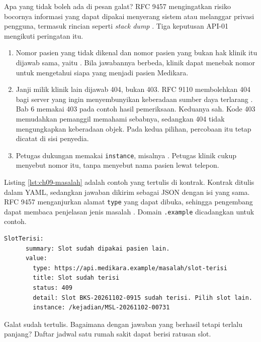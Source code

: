 Apa yang tidak boleh ada di pesan galat? RFC 9457 mengingatkan risiko bocornya informasi yang dapat dipakai menyerang sistem atau melanggar privasi
pengguna, termasuk rincian seperti \textit{stack dump} \cite{rfc9457}. Tiga keputusan API-01 mengikuti peringatan itu.
\begin{enumerate}
  \item Nomor pasien yang tidak dikenal dan nomor pasien yang bukan hak klinik itu dijawab sama, yaitu . Bila
        jawabannya berbeda, klinik dapat menebak nomor untuk mengetahui siapa yang menjadi pasien Medikara.
  \item Janji milik klinik lain dijawab 404, bukan 403. RFC 9110 membolehkan 404 bagi server yang ingin menyembunyikan keberadaan sumber daya
        terlarang \cite{rfc9110}. Bab 6 memakai 403 pada contoh hasil pemeriksaan. Keduanya sah. Kode 403 memudahkan pemanggil memahami sebabnya, sedangkan
        404 tidak mengungkapkan keberadaan objek. Pada kedua pilihan, percobaan itu tetap dicatat di sisi penyedia.
  \item Petugas dukungan memakai \texttt{instance}, misalnya . Petugas klinik cukup menyebut nomor itu, tanpa
        menyebut nama pasien lewat telepon.
\end{enumerate}

\begin{pendalaman}[title={Pendalaman Teknis (opsional): Membaca Contoh Problem Details}]
Listing \ref{lst:ch09-masalah} adalah contoh yang tertulis di kontrak. Kontrak ditulis dalam YAML, sedangkan
jawaban dikirim sebagai JSON dengan isi yang sama. RFC 9457 menganjurkan alamat \texttt{type} yang dapat dibuka, sehingga pengembang dapat membaca
penjelasan jenis masalah \cite{rfc9457}. Domain \texttt{.example} dicadangkan untuk contoh.

\begin{lstlisting}[style=ch09yaml, caption={Contoh galat slot terisi, tersedia di \berkas{sources/chapter09/kontrak-api-01-janji-temu.yaml}}, label={lst:ch09-masalah}]
    SlotTerisi:
      summary: Slot sudah dipakai pasien lain.
      value:
        type: https://api.medikara.example/masalah/slot-terisi
        title: Slot sudah terisi
        status: 409
        detail: Slot BKS-20261102-0915 sudah terisi. Pilih slot lain.
        instance: /kejadian/MSL-20261102-00731
\end{lstlisting}
\end{pendalaman}

Galat sudah tertulis. Bagaimana dengan jawaban yang berhasil tetapi terlalu panjang? Daftar jadwal satu rumah sakit dapat berisi ratusan slot.

